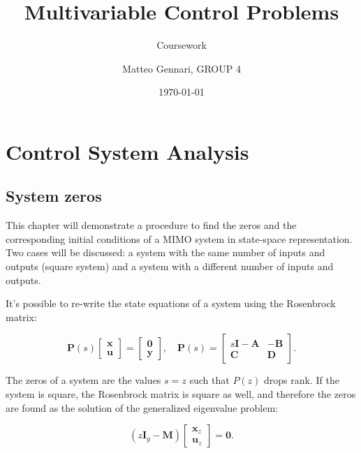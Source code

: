 \documentclass{scrreprt}
\title{Multivariable Control Problems}
\author{Matteo Gennari, GROUP 4}
\date{\today}
\subtitle{Coursework}
\begin{document}
\maketitle

\tableofcontents 

\cleardoublepage

\pagestyle{plain}


\chapter{Control System Analysis}
\section{System zeros}
This chapter will demonstrate a procedure to find the zeros and the corresponding initial conditions of a MIMO system in state-space representation. Two cases will be discussed: a system with the same number of inputs and outputs (square system) and a system with a different number of inputs and outputs.

It's possible to re-write the state equations of a system using the Rosenbrock matrix:

\begin{equation}
  \boldsymbol{P}(s) \begin{bmatrix} \boldsymbol{x} \\ \boldsymbol{u} \end{bmatrix} = \begin{bmatrix} \boldsymbol{0} \\ \boldsymbol{y} \end{bmatrix}, \quad \boldsymbol{P}(s) = \begin{bmatrix} s\boldsymbol{I} - \boldsymbol{A} & -\boldsymbol{B} \\ \boldsymbol{C} & \boldsymbol{D} \end{bmatrix} \text{.}
  \label{eq:P(s)}
\end{equation}

The zeros of a system are the values $s=z$ such that $P(z)$ drops rank. If the system is square, the Rosenbrock matrix is square as well, and therefore the zeros are found as the solution of the generalized eigenvalue problem:

\begin{equation}
  (z\boldsymbol{I}_g - \boldsymbol{M}) \begin{bmatrix} \boldsymbol{x}_z \\ \boldsymbol{u}_z \end{bmatrix} = \boldsymbol{0} \text{.}
  \label{eq:GenEig}
\end{equation}
\end{document}
